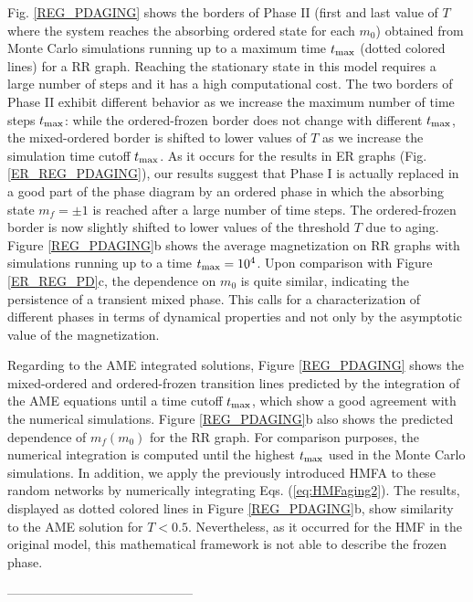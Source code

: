 Fig. \ref{REG_PDAGING} shows the borders of Phase II (first and last value of $T$ where the system reaches the absorbing ordered state for each $m_0$) obtained from Monte Carlo simulations running up to a maximum time $t_{\rm max}$ (dotted colored lines) for a RR graph. Reaching the stationary state in this model requires a large number of steps and it has a high computational cost. The two borders of Phase II exhibit different behavior as we increase the maximum number of time steps $t_{\rm max}$: while the ordered-frozen border does not change with different $t_{\rm max}$, the mixed-ordered border is shifted to lower values of $T$ as we increase the simulation time cutoff $t_{\rm max}$. As it occurs for the results in ER graphs (Fig. \ref{ER_REG_PDAGING}), our results suggest that Phase I is actually replaced in a good part of the phase diagram by an ordered phase in which the absorbing state $m_f = \pm 1$ is reached after a large number of time steps. The ordered-frozen border is now slightly shifted to lower values of the threshold $T$ due to aging. Figure \ref{REG_PDAGING}b shows the average magnetization on RR graphs with simulations running up to a time $t_{\rm max} = 10^4$. Upon comparison with Figure \ref{ER_REG_PD}c, the dependence on $m_0$ is quite similar, indicating the persistence of a transient mixed phase. This calls for a characterization of different phases in terms of dynamical properties and not only by the asymptotic value of the magnetization.

Regarding to the AME integrated solutions, Figure \ref{REG_PDAGING} shows the mixed-ordered and ordered-frozen transition lines predicted by the integration of the AME equations until a time cutoff $t_{\rm max}$, which show a good agreement with the numerical simulations. Figure \ref{REG_PDAGING}b also shows the predicted dependence of $m_f(m_0)$ for the RR graph. For comparison purposes, the numerical integration is computed until the highest $t_{\rm max}$ used in the Monte Carlo simulations. In addition, we apply the previously introduced HMFA to these random networks by numerically integrating Eqs. (\ref{eq:HMFaging2}). The results, displayed as dotted colored lines in Figure \ref{REG_PDAGING}b, show similarity to the AME solution for $T < 0.5$. Nevertheless, as it occurred for the HMF in the original model, this mathematical framework is not able to describe the frozen phase.


--------------------------------------------

